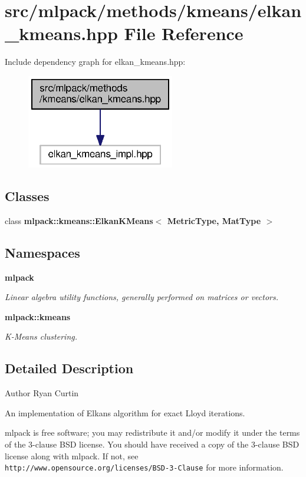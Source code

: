 \section{src/mlpack/methods/kmeans/elkan\+\_\+kmeans.hpp File Reference}
\label{elkan__kmeans_8hpp}
Include dependency graph for elkan\+\_\+kmeans.\+hpp\+:
\nopagebreak
\begin{figure}[H]
\begin{center}
\leavevmode
\includegraphics[width=183pt]{elkan__kmeans_8hpp__incl}
\end{center}
\end{figure}
\subsection*{Classes}
\begin{DoxyCompactItemize}
\item 
class {\bf mlpack\+::kmeans\+::\+Elkan\+K\+Means$<$ Metric\+Type, Mat\+Type $>$}
\end{DoxyCompactItemize}
\subsection*{Namespaces}
\begin{DoxyCompactItemize}
\item 
 {\bf mlpack}
\begin{DoxyCompactList}\small\item\em Linear algebra utility functions, generally performed on matrices or vectors. \end{DoxyCompactList}\item 
 {\bf mlpack\+::kmeans}
\begin{DoxyCompactList}\small\item\em K-\/\+Means clustering. \end{DoxyCompactList}\end{DoxyCompactItemize}


\subsection{Detailed Description}
\begin{DoxyAuthor}{Author}
Ryan Curtin
\end{DoxyAuthor}
An implementation of Elkan\textquotesingle{}s algorithm for exact Lloyd iterations.

mlpack is free software; you may redistribute it and/or modify it under the terms of the 3-\/clause B\+SD license. You should have received a copy of the 3-\/clause B\+SD license along with mlpack. If not, see {\tt http\+://www.\+opensource.\+org/licenses/\+B\+S\+D-\/3-\/\+Clause} for more information. 
